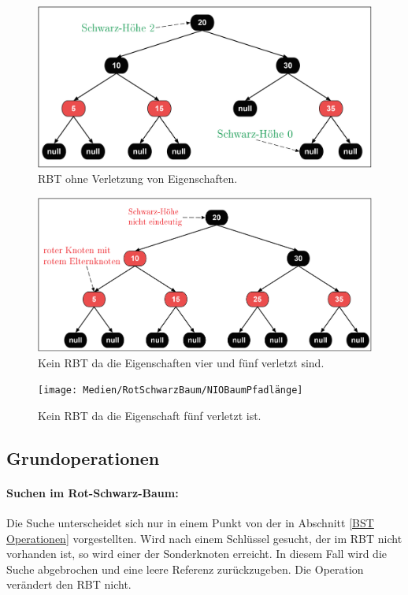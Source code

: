 \documentclass[a4paper,12pt]{article}
\begin{document}
\begin{figure}[H]
	\centering
	\includegraphics[width= 1\textwidth]{Medien/RotSchwarzBaum/IOBaum}
	\caption{RBT ohne Verletzung von Eigenschaften. }
	\label{fig:IOBaum}
\end{figure}
\begin{figure}[H]
	\centering
	\includegraphics[width= 1\textwidth]{Medien/RotSchwarzBaum/NIOBaumZweiRote}
	\caption{Kein RBT da die Eigenschaften vier und fünf verletzt sind. }
	\label{fig:NIOBaumZweiRote}
\end{figure}
\begin{figure}[H]
	\centering
	\texttt{[image: Medien/RotSchwarzBaum/NIOBaumPfadlänge]}
	\caption{Kein RBT da die Eigenschaft fünf verletzt ist.  }
	\label{fig:NIOBaumPfadlänge}
\end{figure}
\subsection{Grundoperationen}
\paragraph{Suchen im Rot-Schwarz-Baum:}
Die Suche unterscheidet sich nur in einem Punkt von der in Abschnitt \ref{BST Operationen} vorgestellten. Wird nach einem Schlüssel gesucht, der im RBT nicht vorhanden ist, so wird einer der Sonderknoten erreicht. In diesem Fall wird die Suche abgebrochen und eine leere Referenz zurückzugeben. Die Operation verändert den RBT nicht. 
\end{document}
